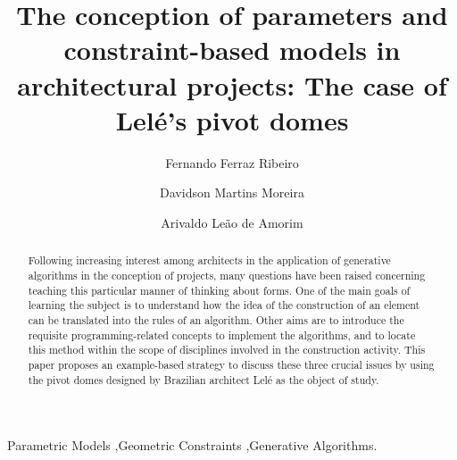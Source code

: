 \documentclass[preprint,12pt,3p]{elsarticle}
\begin{document}
\begin{frontmatter}

\title{The conception of parameters and constraint-based models in architectural projects: The case of Lel\'e's pivot domes}


\author[cimatec]{Fernando Ferraz Ribeiro}

\author[cimatec]{Davidson Martins Moreira}



\author[lcadufba]{Arivaldo Le\~ao de Amorim}

\address[cimatec]{Programa de Modelagem Computacional, SENAI Cimatec, Av. Orlando Gomes 1845, 41.650-010 Salvador, Bahia, Brazil}

\address[lcadufba]{Laborat\'orio de Computa\c{c}\~ao Gr\'afica Aplicada \`a Arquitetura e ao Desenho – LCAD, Faculdade de Arquitetura, Universidade Federal da Bahia (UFBA), Salvador, BA, Brasil}


\begin{abstract}

Following increasing interest among architects in the application of generative algorithms in the conception of projects, many questions have been raised concerning teaching this particular manner of thinking about forms. One of the main goals of learning the subject is to understand how the idea of the construction of an element can be translated into the rules of an algorithm. Other aims are to introduce the requisite programming-related concepts to implement the algorithms, and to locate this method within the scope of disciplines involved in the construction activity. This paper proposes an example-based strategy to discuss these three crucial issues by using the pivot domes designed by Brazilian architect Lel\'e as the object of study. 

\end{abstract}

\begin{keyword}
Parametric Models \sep Geometric Constraints \sep Generative Algorithms.
\end{keyword}

\end{frontmatter}

\end{document}

